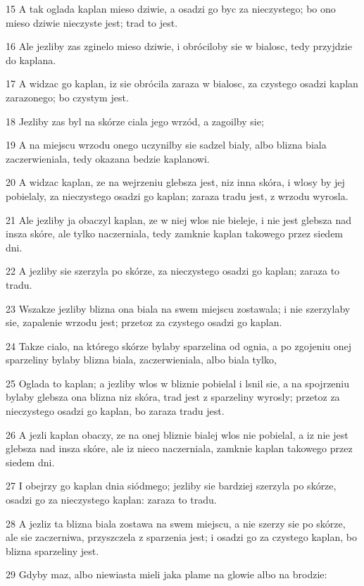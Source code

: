\par 15 A tak oglada kaplan mieso dziwie, a osadzi go byc za nieczystego; bo ono mieso dziwie nieczyste jest; trad to jest.
\par 16 Ale jezliby zas zginelo mieso dziwie, i obróciloby sie w bialosc, tedy przyjdzie do kaplana.
\par 17 A widzac go kaplan, iz sie obrócila zaraza w bialosc, za czystego osadzi kaplan zarazonego; bo czystym jest.
\par 18 Jezliby zas byl na skórze ciala jego wrzód, a zagoilby sie;
\par 19 A na miejscu wrzodu onego uczynilby sie sadzel bialy, albo blizna biala zaczerwieniala, tedy okazana bedzie kaplanowi.
\par 20 A widzac kaplan, ze na wejrzeniu glebsza jest, niz inna skóra, i wlosy by jej pobielaly, za nieczystego osadzi go kaplan; zaraza tradu jest, z wrzodu wyrosla.
\par 21 Ale jezliby ja obaczyl kaplan, ze w niej wlos nie bieleje, i nie jest glebsza nad insza skóre, ale tylko naczerniala, tedy zamknie kaplan takowego przez siedem dni.
\par 22 A jezliby sie szerzyla po skórze, za nieczystego osadzi go kaplan; zaraza to tradu.
\par 23 Wszakze jezliby blizna ona biala na swem miejscu zostawala; i nie szerzylaby sie, zapalenie wrzodu jest; przetoz za czystego osadzi go kaplan.
\par 24 Takze cialo, na którego skórze bylaby sparzelina od ognia, a po zgojeniu onej sparzeliny bylaby blizna biala, zaczerwieniala, albo biala tylko,
\par 25 Oglada to kaplan; a jezliby wlos w bliznie pobielal i lsnil sie, a na spojrzeniu bylaby glebsza ona blizna niz skóra, trad jest z sparzeliny wyrosly; przetoz za nieczystego osadzi go kaplan, bo zaraza tradu jest.
\par 26 A jezli kaplan obaczy, ze na onej bliznie bialej wlos nie pobielal, a iz nie jest glebsza nad insza skóre, ale iz nieco naczerniala, zamknie kaplan takowego przez siedem dni.
\par 27 I obejrzy go kaplan dnia siódmego; jezliby sie bardziej szerzyla po skórze, osadzi go za nieczystego kaplan: zaraza to tradu.
\par 28 A jezliz ta blizna biala zostawa na swem miejscu, a nie szerzy sie po skórze, ale sie zaczerniwa, przyszczela z sparzenia jest; i osadzi go za czystego kaplan, bo blizna sparzeliny jest.
\par 29 Gdyby maz, albo niewiasta mieli jaka plame na glowie albo na brodzie:
